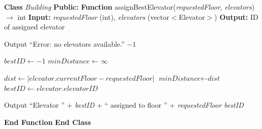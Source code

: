 \documentclass[a4paper,11pt]{article}
\begin{document}
\begin{algorithm}
\caption{Assign Best Elevator}
\begin{algorithmic}[1]

\State \textbf{Class} \textit{Building}
\State \hspace{0.5cm} \textbf{Public:}
\State \hspace{1cm} \textbf{Function} assignBestElevator(\textit{requestedFloor}, \textit{elevators}) $\rightarrow$ int
\State \hspace{1.5cm} \textbf{Input:} \textit{requestedFloor} (int), \textit{elevators} (vector$<$Elevator$>$)
\State \hspace{1.5cm} \textbf{Output:} ID of assigned elevator

    \State Output ``Error: no elevators available.''
    \State \Return $-1$
\EndIf

\State $\textit{bestID} \leftarrow -1$
\State $\textit{minDistance} \leftarrow \infty$

    \State $\textit{dist} \leftarrow |\textit{elevator}.\textit{currentFloor} - \textit{requestedFloor}|$
        \State $\textit{minDistance} \leftarrow \textit{dist}$
        \State $\textit{bestID} \leftarrow \textit{elevator}.\textit{elevatorID}$
    \EndIf
\EndFor

\State Output ``Elevator '' + \textit{bestID} + `` assigned to floor '' + \textit{requestedFloor}
\State \Return \textit{bestID}

\State \hspace{1cm} \textbf{End Function}
\State \textbf{End Class}

\end{algorithmic}
\end{algorithm}
\end{document}
